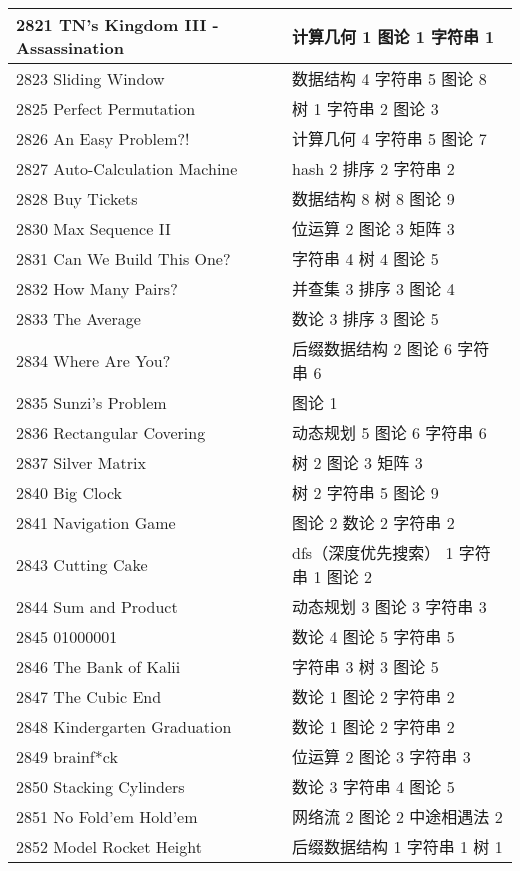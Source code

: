 \begin{longtable}{| p{} | p{} |}
 2821 TN's Kingdom III - Assassination  & 计算几何 1 图论 1 字符串 1 \\ \hline
 2823 Sliding Window  & 数据结构 4 字符串 5 图论 8 \\ \hline
 2825 Perfect Permutation  & 树 1 字符串 2 图论 3 \\ \hline
 2826 An Easy Problem?!  & 计算几何 4 字符串 5 图论 7 \\ \hline
 2827 Auto-Calculation Machine  & hash 2 排序 2 字符串 2 \\ \hline
 2828 Buy Tickets  & 数据结构 8 树 8 图论 9 \\ \hline
 2830 Max Sequence II  & 位运算 2 图论 3 矩阵 3 \\ \hline
 2831 Can We Build This One?  & 字符串 4 树 4 图论 5 \\ \hline
 2832 How Many Pairs?  & 并查集 3 排序 3 图论 4 \\ \hline
 2833 The Average  & 数论 3 排序 3 图论 5 \\ \hline
 2834 Where Are You?  & 后缀数据结构 2 图论 6 字符串 6 \\ \hline
 2835 Sunzi's Problem  & 图论 1 \\ \hline
 2836 Rectangular Covering  & 动态规划 5 图论 6 字符串 6 \\ \hline
 2837 Silver Matrix  & 树 2 图论 3 矩阵 3 \\ \hline
 2840 Big Clock  & 树 2 字符串 5 图论 9 \\ \hline
 2841 Navigation Game  & 图论 2 数论 2 字符串 2 \\ \hline
 2843 Cutting Cake  & dfs（深度优先搜索） 1 字符串 1 图论 2 \\ \hline
 2844 Sum and Product  & 动态规划 3 图论 3 字符串 3 \\ \hline
 2845 01000001  & 数论 4 图论 5 字符串 5 \\ \hline
 2846 The Bank of Kalii  & 字符串 3 树 3 图论 5 \\ \hline
 2847 The Cubic End  & 数论 1 图论 2 字符串 2 \\ \hline
 2848 Kindergarten Graduation  & 数论 1 图论 2 字符串 2 \\ \hline
 2849 brainf*ck  & 位运算 2 图论 3 字符串 3 \\ \hline
 2850 Stacking Cylinders  & 数论 3 字符串 4 图论 5 \\ \hline
 2851 No Fold'em Hold'em  & 网络流 2 图论 2 中途相遇法 2 \\ \hline
 2852 Model Rocket Height  & 后缀数据结构 1 字符串 1 树 1 \\ \hline

\end{longtable}
